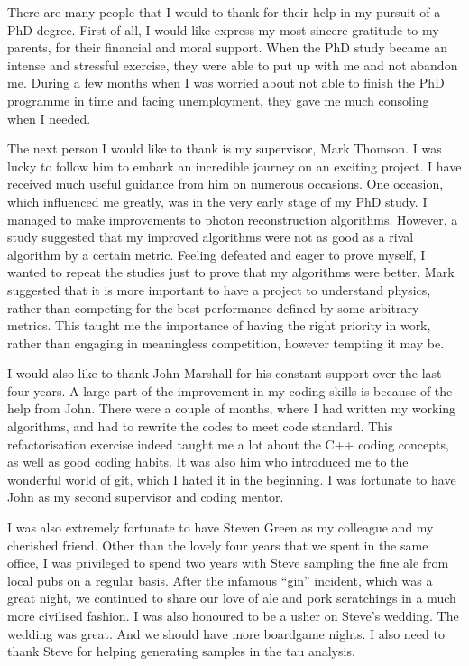 \begin{acknowledgements}
There are many people that I would to thank  for their help in my pursuit of a PhD degree. First of all, I would like express my most sincere gratitude to my parents, for their financial and moral support. When the PhD study became an intense and stressful exercise, they were able to put up with me and not abandon me. During a few months when I was worried about not able to finish the PhD programme in time and facing unemployment, they gave me much consoling  when I needed.


The next person I would like to thank is my supervisor, Mark Thomson. I was lucky to follow him to embark an incredible journey on an exciting project. I have received much useful guidance from him on numerous occasions. One occasion, which influenced me greatly, was in the very early stage of my PhD study. I managed to make improvements to photon reconstruction algorithms. However, a study suggested that my improved algorithms were not as good as a rival algorithm by a certain metric. Feeling defeated and eager to prove myself, I wanted to repeat the studies just to prove that my algorithms were better. Mark suggested that it is more important to have a project to understand physics, rather than competing for the best performance defined by some arbitrary metrics. This taught me the importance of having the right priority in work, rather than engaging in meaningless competition, however tempting it may be.

I would also like to thank John Marshall for his constant support over the last four years. A large part of the improvement in my coding skills is because of the help from John. There were a couple of months, where I had written my working algorithms, and had to rewrite the codes to meet \pandora code standard. This refactorisation exercise indeed taught me a lot about the C++ coding concepts, as well as good coding habits. It was also him who introduced me to the wonderful world of git, which I hated it in the beginning. I was fortunate to have John as my second supervisor and coding mentor.

I was also extremely fortunate to have Steven Green as my colleague and my cherished friend. Other than the lovely four years that we spent in the same office,   I was privileged to spend two years with Steve sampling the fine ale from local pubs on a regular basis. After the infamous ``gin'' incident, which was a great night, we continued to share our love of ale and pork scratchings in a much more civilised fashion. I was also honoured to be a usher on Steve's wedding. The wedding was great. And we should have more boardgame nights. I also need to thank Steve for helping generating samples in the tau analysis.


\end{acknowledgements}
